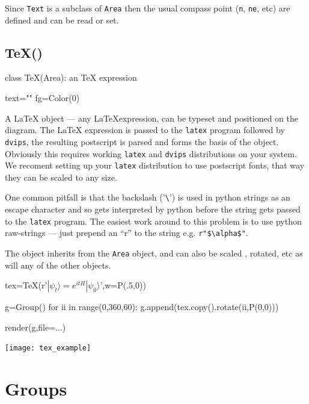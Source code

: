 \documentclass[a4paper]{book}
\begin{document}
Since \Verb|Text| is a subclass of \Verb|Area| then the usual compass point
(\Verb|n|, \Verb|ne|, etc) are defined and can be read or set.
\subsection{TeX()}
\label{sec:tex}
\begin{python}
class TeX(Area):
    an TeX expression

    text=""
    fg=Color(0)
\end{python}

A \LaTeX{} object --- any \LaTeX expression, can be typeset and
positioned on the diagram.  The \LaTeX{} expression is passed to the
\Verb|latex| program followed by \Verb|dvips|, the resulting
postscript is parsed and forms the basis of the object. Obviously this
requires working \Verb|latex| and \Verb|dvips| distributions on your
system. We recoment setting up your \Verb|latex| distribution to
use postscript fonts, that way they can be scaled to any size.

One common pitfall is that the backslash ('\Verb|\|') is used in python
strings as an escape character and so gets interpreted by python before
the string gets passed to the \Verb|latex| program. The easiest work
around to this problem is to use python raw-strings --- just prepend an
``r'' to the string e.g. \Verb|r"$\alpha$"|.

The object inherits from the \Verb|Area| object, and can also be
scaled , rotated, etc as will any of the other objects.
\begin{example}
\begin{python}
tex=TeX(r'$|\psi_t\rangle=e^{itH}|\psi_0\rangle$',w=P(.5,0))

g=Group()
for ii in range(0,360,60):
    g.append(tex.copy().rotate(ii,P(0,0)))

render(g,file=...)
\end{python}
\begin{center}
  \texttt{[image: tex\_example]}
\end{center}
\end{example}
\section{Groups}

\end{document}
